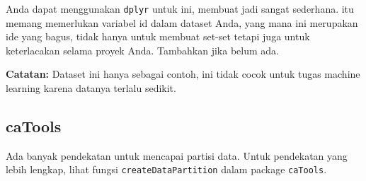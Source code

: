 \documentclass[
]{book}
\newenvironment{Shaded}{\begin{snugshade}}{\end{snugshade}}
\newcommand{\AttributeTok}[1]{\textcolor[rgb]{0.13,0.29,0.53}{#1}}
\newcommand{\CommentTok}[1]{\textcolor[rgb]{0.56,0.35,0.01}{\textit{#1}}}
\newcommand{\DecValTok}[1]{\textcolor[rgb]{0.00,0.00,0.81}{#1}}
\newcommand{\FunctionTok}[1]{\textcolor[rgb]{0.13,0.29,0.53}{\textbf{#1}}}
\newcommand{\NormalTok}[1]{#1}
\newcommand{\OtherTok}[1]{\textcolor[rgb]{0.56,0.35,0.01}{#1}}
\newcommand{\SpecialCharTok}[1]{\textcolor[rgb]{0.81,0.36,0.00}{\textbf{#1}}}
\newcommand{\StringTok}[1]{\textcolor[rgb]{0.31,0.60,0.02}{#1}}
\begin{document}
Anda dapat menggunakan \texttt{dplyr} untuk ini, membuat jadi sangat sederhana. itu memang memerlukan variabel id dalam dataset Anda, yang mana ini merupakan ide yang bagus, tidak hanya untuk membuat set-set tetapi juga untuk keterlacakan selama proyek Anda. Tambahkan jika belum ada.

\begin{Shaded}
\end{Shaded}

\textbf{Catatan:} Dataset ini hanya sebagai contoh, ini tidak cocok untuk tugas machine learning karena datanya terlalu sedikit.

\hypertarget{catools}{%
\subsection{caTools}\label{catools}}

Ada banyak pendekatan untuk mencapai partisi data. Untuk pendekatan yang lebih lengkap, lihat fungsi \texttt{createDataPartition} dalam package \texttt{caTools}.
\end{document}
